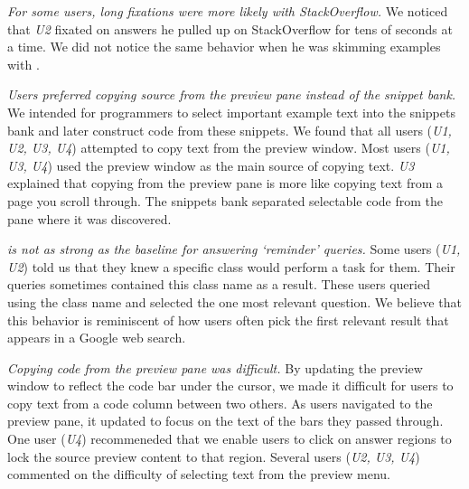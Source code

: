 \emph{For some users, long fixations were more likely with StackOverflow.}
We noticed that \emph{U2} fixated on answers he pulled up on StackOverflow for tens of seconds at a time.
We did not notice the same behavior when he was skimming examples with \systemname{}.

\emph{Users preferred copying source from the preview pane instead of the snippet bank.}
We intended for programmers to select important example text into the snippets bank and later construct code from these snippets.
We found that all users (\emph{U1, U2, U3, U4}) attempted to copy text from the preview window.
Most users (\emph{U1, U3, U4}) used the preview window as the main source of copying text.
\emph{U3} explained that copying from the preview pane is more like copying text from a page you scroll through.
The snippets bank separated selectable code from the pane where it was discovered.

\emph{\systemname{} is not as strong as the baseline for answering `reminder' queries.}
Some users (\emph{U1, U2}) told us that they knew a specific class would perform a task for them.
Their queries sometimes contained this class name as a result.
These users queried \systemname{} using the class name and selected the one most relevant question.
We believe that this behavior is reminiscent of how users often pick the first relevant result that appears in a Google web search.

\emph{Copying code from the preview pane was difficult.}
By updating the preview window to reflect the code bar under the cursor, we made it difficult for users to copy text from a code column between two others.
As users navigated to the preview pane, it updated to focus on the text  of the bars they passed through.
One user (\emph{U4}) recommeneded that we enable users to click on answer regions to lock the source preview content to that region.
Several users (\emph{U2, U3, U4}) commented on the difficulty of selecting text from the preview menu.